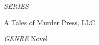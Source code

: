 \documentclass{novel}
\begin{document}
\frontmatter
\thispagestyle{empty}
\begin{parascale}[2]
\vspace*{3\nbs}
\centering{}\par
\centering{}\par
{}\par
\end{parascale}
\clearpage
\thispagestyle{empty}
\null %
\clearpage
\thispagestyle{empty}
\begin{parascale}[4]
\centering{}\par
\centering{}\par
{}\par
\end{parascale}
\vspace*{2\nbs}

\begin{parascale}[1]
\centering\textit{SERIES}\par
\vspace*{3\nbs}
\par
\end{parascale}
\vfill
\begin{parascale}[1]

A Tales of Murder Press, LLC\par
\textit{GENRE} Novel\par
\end{parascale}
\clearpage
\thispagestyle{empty}
\null\vfill
\null\null
{}\par
\null\null
\vfill
\begin{adjustwidth}{3em}{3em}
\end{adjustwidth}
\clearpage
\thispagestyle{empty}
\clearpage %
\thispagestyle{empty}
\begin{toc}[0.5]{0em}
{\centering{}\par}
\null

\end{toc}
\clearpage
\end{document}
